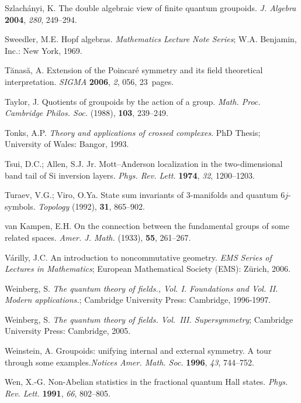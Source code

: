 \documentclass[12pt]{article}
\theoremstyle{plain}
\theoremstyle{definition}
\numberwithin{equation}{section}
\begin{document}
\begin{thebibliography}{199}
Szlach\'anyi, K. The double algebraic view of f\/inite quantum groupoids. {\em J. Algebra} {\bf 2004}, {\em280}, 249--294.

Sweedler, M.E.  Hopf algebras. {\em Mathematics Lecture Note Series}; W.A. Benjamin, Inc.: New York, 1969.

T\u{a}nas\u{a},  A.  Extension of the Poincar\'e symmetry and its field theoretical interpretation. {\em SIGMA}  {\bf 2006}, {\em 2}, 056, 23~pages. %

Taylor, J. Quotients of groupoids by the action of a group. \emph{Math. Proc. Cambridge Philos. Soc.} (1988), {\bf 103}, 239--249.

Tonks, A.P. {\em Theory and applications of crossed complexes}. PhD Thesis; University of Wales: Bangor, 1993.

Tsui, D.C.; Allen, S.J. Jr.  Mott--Anderson localization in the two-dimensional band tail of Si inversion layers. {\em Phys. Rev. Lett.}  {\bf 1974}, {\em 32}, 1200--1203.

Turaev, V.G.; Viro, O.Ya. State sum invariants of 3-manifolds and quantum $6j$-symbols. \emph{Topology} (1992), {\bf 31}, 865--902.

van Kampen, E.H. On the connection between the fundamental groups of some related spaces. \emph{Amer. J. Math.} (1933), {\bf 55}, 261--267.

V\'arilly, J.C. An introduction to noncommutative geometry. {\em EMS Series of Lectures in Mathematics}; European Mathematical Society (EMS): Z\"{u}rich, 2006.

Weinberg, S. {\em The quantum theory of fields., Vol. I. Foundations and Vol. II. Modern applications.}; Cambridge University Press: Cambridge, 1996-1997.

Weinberg, S. {\em The quantum theory of fields. Vol.~III. Supersymmetry}; Cambridge University Press: Cambridge, 2005.

Weinstein, A.  Groupoids: unifying internal and external symmetry. A tour through some examples.{\em Notices Amer. Math. Soc.} {\bf 1996}, {\em 43}, 744--752. 

Wen, X.-G.  Non-Abelian statistics in the fractional quantum Hall states. {\em Phys. Rev. Lett.} {\bf 1991}, {\em 66}, 802--805.


\end{thebibliography}
\end{document}
